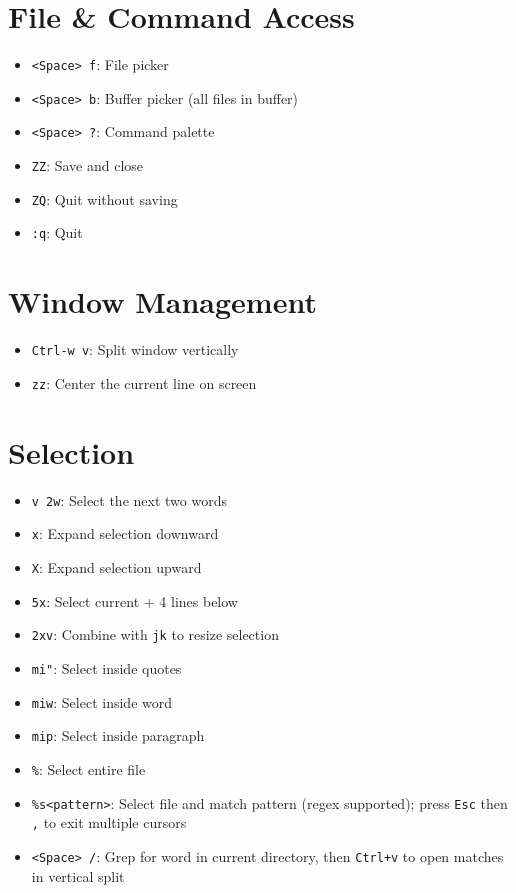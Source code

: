 \documentclass[
  letterpaper,
  DIV=11,
  numbers=noendperiod]{scrartcl}
\providecommand{\tightlist}{%
  \setlength{\itemsep}{0pt}\setlength{\parskip}{0pt}}\usepackage{longtable,booktabs,array}
\begin{document}
\section{File \& Command Access}\label{file-command-access}

\begin{itemize}
\tightlist
\item
  \texttt{\textless{}Space\textgreater{}\ f}: File picker
\item
  \texttt{\textless{}Space\textgreater{}\ b}: Buffer picker (all files
  in buffer)
\item
  \texttt{\textless{}Space\textgreater{}\ ?}: Command palette
\item
  \texttt{ZZ}: Save and close
\item
  \texttt{ZQ}: Quit without saving
\item
  \texttt{:q}: Quit
\end{itemize}

\section{Window Management}\label{window-management}

\begin{itemize}
\tightlist
\item
  \texttt{Ctrl-w\ v}: Split window vertically
\item
  \texttt{zz}: Center the current line on screen
\end{itemize}

\section{Selection}\label{selection}

\begin{itemize}
\tightlist
\item
  \texttt{v\ 2w}: Select the next two words
\item
  \texttt{x}: Expand selection downward
\item
  \texttt{X}: Expand selection upward
\item
  \texttt{5x}: Select current + 4 lines below
\item
  \texttt{2xv}: Combine with \texttt{jk} to resize selection
\item
  \texttt{mi"}: Select inside quotes
\item
  \texttt{miw}: Select inside word
\item
  \texttt{mip}: Select inside paragraph
\item
  \texttt{\%}: Select entire file
\item
  \texttt{\%s\textless{}pattern\textgreater{}}: Select file and match
  pattern (regex supported); press \texttt{Esc} then \texttt{,} to exit
  multiple cursors
\item
  \texttt{\textless{}Space\textgreater{}\ /}: Grep for word in current
  directory, then \texttt{Ctrl+v} to open matches in vertical split
\end{itemize}
\end{document}
